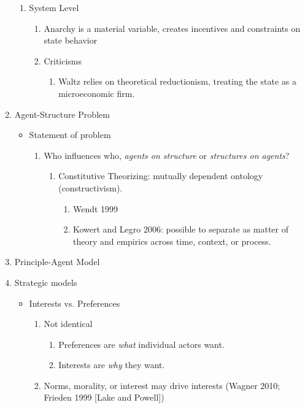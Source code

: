 \documentclass[11pt]{article}
\begin{document}
\begin{enumerate}
\begin{enumerate}
\item System Level
\begin{enumerate}
\item Anarchy is a material variable, creates incentives and
constraints on state behavior
\item Criticisms
\begin{enumerate}
\item Waltz relies on theoretical reductionism, treating the state
as a microeconomic firm.
\end{enumerate}
\end{enumerate}
\end{enumerate}
\item Agent-Structure Problem
\label{sec-1-1-2}
\begin{itemize}
\item Statement of problem
\label{sec-1-1-2-1}
\begin{enumerate}
\item Who influences who, \emph{agents on structure} or \emph{structures on agents}?
\begin{enumerate}
\item Constitutive Theorizing: mutually dependent ontology (constructivism).
\begin{enumerate}
\item Wendt 1999
\item Kowert and Legro 2006: possible to separate as matter of
theory and empirics across time, context, or process.
\end{enumerate}
\end{enumerate}
\end{enumerate}
\end{itemize}
\item Principle-Agent Model
\label{sec-1-1-3}
\item Strategic models
\label{sec-1-1-4}
\begin{itemize}
\item Interests vs. Preferences
\label{sec-1-1-4-1}
\begin{enumerate}
\item Not identical
\begin{enumerate}
\item Preferences are \emph{what} individual actors want.
\item Interests are \emph{why} they want.
\end{enumerate}
\item Norms, morality, or interest may drive interests (Wagner 2010;
Frieden 1999 [Lake and Powell])

\end{enumerate}
\end{itemize}
\end{enumerate}
\end{document}
